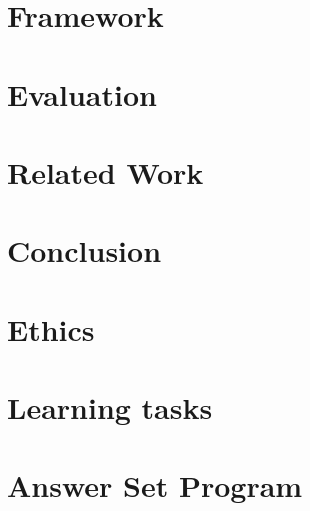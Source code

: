 \documentclass[11pt,twoside]{report}
\theoremstyle{plain}
\theoremstyle{definition}
\begin{document}







\chapter{Framework}
\label{framework}


\chapter{Evaluation}
\label{evaluation}


\chapter{Related Work}
\label{related_work}


\chapter{Conclusion}
\label{conclusion}


\newpage



\newpage
\appendix
\chapter{Ethics}



\newpage
\chapter{Learning tasks}
\label{chap:learning_tasks}


\newpage
\chapter{Answer Set Program}

\end{document}
